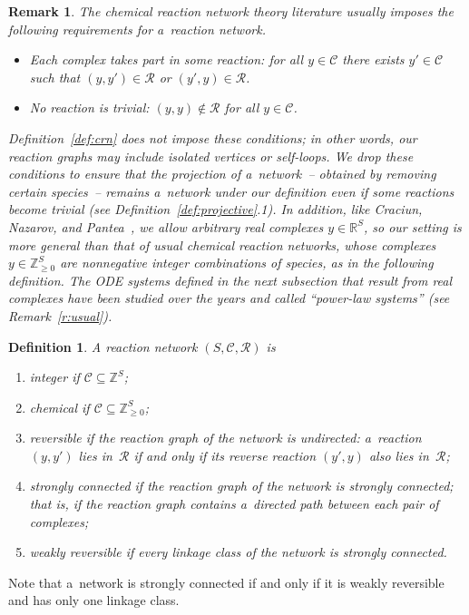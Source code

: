 \documentclass[pdftex]{sigma}
\newtheorem{Definition}[Theorem]{Definition}
\newtheorem{Remark}[Theorem]{Remark}
\begin{document}
\begin{Remark}
\label{rmk:genl_crn}
The chemical reaction network  theory literature usually imposes the following requirements for a~reaction network.
\begin{itemize}\itemsep=0pt
\item Each complex takes part in some reaction: for all $y\in\mathcal C$ there exists $y'\in\mathcal C$ such that
$(y,y')\in\mathcal R$ or $(y',y)\in\mathcal R$.
\item No reaction is trivial: $(y,y)\notin\mathcal R$ for all $y\in\mathcal C$.
\end{itemize}
Def\/inition~\ref{def:crn} does \emph{not} impose these conditions; in other words, our reaction graphs may include
isolated vertices or self-loops.
We drop these conditions to ensure that the projection of a~network~-- obtained by removing certain species~-- remains
a~network under our def\/inition even if some reactions become trivial (see Def\/inition~\ref{def:projective}.1).
In addition, like Craciun, Nazarov, and Pantea~\cite[\S~7]{CNP}, we allow arbitrary real complexes $y\in\mathbb{R}^S$,
so our setting is more general than that of usual chemical reaction networks, whose complexes $y\in\mathbb{Z}_{\geq0}^S$
are nonnegative integer combinations of species, as in the following def\/inition.
The ODE systems def\/ined in the next subsection that result from real complexes have been studied over the years and
called ``power-law systems'' (see Remark~\ref{r:usual}).
\end{Remark}

\begin{Definition}\label{def:network}
A reaction network $(S,\mathcal C,\mathcal R)$ is
\begin{enumerate}\itemsep=0pt
\item[1)] \emph{integer} if $\mathcal C\subseteq\mathbb{Z}^S$;
\item[2)] \emph{chemical} if $\mathcal C\subseteq\mathbb{Z}_{\geq0}^S$;
\item[3)] \emph{reversible} if the reaction graph of the network is undirected: a~reaction $(y,y')$ lies in~$\mathcal R$ if
and only if its reverse reaction $(y',y)$ also lies in~$\mathcal R$;
\item[4)] \emph{strongly connected} if the reaction graph of the network is strongly connected; that is, if the reaction
graph contains a~directed path between each pair of complexes;
\item[5)] \emph{weakly reversible} if every linkage class of the network is strongly connected.
\end{enumerate}
\end{Definition}
Note that a~network is strongly connected if and only if it is weakly reversible and has only one linkage class.
\end{document}
